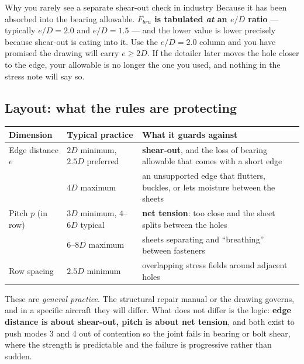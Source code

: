 \documentclass[11pt,a4paper]{article}
\begin{document}
\begin{aerobox}{Why you rarely see a separate shear-out check in industry}
Because it has been absorbed into the bearing allowable. \textbf{$F_{bru}$ is tabulated \emph{at}
an $e/D$ ratio} --- typically $e/D=2.0$ and $e/D=1.5$ --- and the lower value is lower precisely
because shear-out is eating into it. Use the $e/D=2.0$ column and you have promised the drawing
will carry $e\ge 2D$. If the detailer later moves the hole closer to the edge, your allowable is
no longer the one you used, and nothing in the stress note will say so.
\end{aerobox}

\subsection{Layout: what the rules are protecting}

\begin{center}\small
\begin{tabular}{@{}llp{7.4cm}@{}}
\toprule
Dimension & Typical practice & What it guards against\\
\midrule
Edge distance $e$ & $2D$ minimum, $2.5D$ preferred & \textbf{shear-out}, and the loss of bearing
  allowable that comes with a short edge\\[2pt]
 & $4D$ maximum & an unsupported edge that flutters, buckles, or lets moisture between the sheets\\[2pt]
Pitch $p$ (in row) & $3D$ minimum, $4$--$6D$ typical & \textbf{net tension}: too close and the
  sheet splits between the holes\\[2pt]
 & $6$--$8D$ maximum & sheets separating and ``breathing'' between fasteners\\[2pt]
Row spacing & $2.5D$ minimum & overlapping stress fields around adjacent holes\\
\bottomrule
\end{tabular}
\end{center}

\medskip
These are \emph{general practice}. The structural repair manual or the drawing governs, and in a
specific aircraft they will differ. What does not differ is the logic: \textbf{edge distance is
about shear-out, pitch is about net tension}, and both exist to push modes 3 and 4 out of
contention so the joint fails in bearing or bolt shear, where the strength is predictable and the
failure is progressive rather than sudden.
\end{document}
